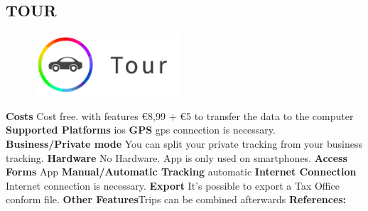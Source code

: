 \begin{singlespace}
\section{TOUR}
\begin{figure}
  \begin{center}
    \includegraphics[width=0.48\textwidth]{bilder/tour}
  \end{center}
\end{figure}
\textbf{Costs} Cost free. with features \euro 8,99 + \euro 5 to transfer the data to the computer
\newline\newline
\textbf{Supported Platforms} \gls{ios}
\newline\newline
\textbf{GPS} \gls{gps} connection is necessary.
\newline\newline
\textbf{Business/Private mode} You can split your private tracking from your business tracking.
\newline\newline
\textbf{Hardware} No Hardware. App is only used on smartphones.
\newline\newline
\textbf{Access Forms} App
\newline\newline
\textbf{Manual/Automatic Tracking} automatic
\newline\newline
\textbf{Internet Connection} Internet connection is necessary.
\newline\newline
\textbf{Export} It’s possible to export a Tax Office conform file.
\newline\newline
\textbf{Other Features}Trips can be combined afterwards
\newline\newline
\textbf{References:} \cite{TOUR}
\newpage


\end{singlespace}
